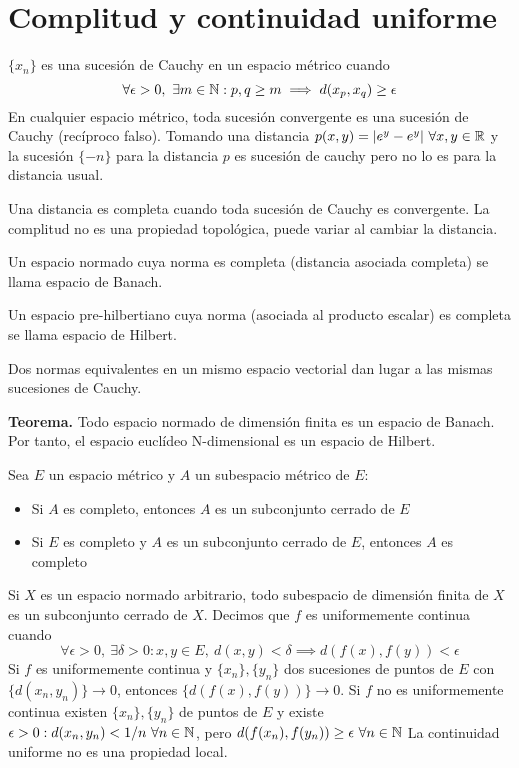 \section{Complitud y continuidad uniforme}
$\{x_n\}$ es una sucesión de Cauchy en un espacio métrico cuando
$$ \forall\epsilon>0, \ \exists m\in\mathbb{N} : p,q\geq m\implies d(x_p,x_q) \geq\epsilon$$
En cualquier espacio métrico, toda sucesión convergente es una sucesión de Cauchy (recíproco falso). Tomando una distancia $p(x,y) = |e^y-e^y| \ \forall x,y\in\R$ y la sucesión $\{-n\}$ para la distancia $p$ es sucesión de cauchy pero no lo es para la distancia usual.

Una distancia es completa cuando toda sucesión de Cauchy es convergente. La complitud no es una propiedad topológica, puede variar al cambiar la distancia.

Un espacio normado cuya norma es completa (distancia asociada completa) se llama espacio de Banach.

Un espacio pre-hilbertiano cuya norma (asociada al producto escalar) es completa se llama espacio de Hilbert.

Dos normas equivalentes en un mismo espacio vectorial dan lugar a las mismas sucesiones de Cauchy.

\textbf{Teorema.} Todo espacio normado de dimensión finita es un espacio de Banach. Por tanto, el espacio euclídeo N-dimensional es un espacio de Hilbert.

Sea $E$ un espacio métrico y $A$ un subespacio métrico de $E$:
\begin{itemize}
	\item Si $A$ es completo, entonces $A$ es un subconjunto cerrado de $E$
	\item Si $E$ es completo y $A$ es un subconjunto cerrado de $E$, entonces $A$ es completo
\end{itemize}
Si $X$ es un espacio normado arbitrario, todo subespacio de dimensión finita de $X$ es un subconjunto cerrado de $X$.
Decimos que $f$ es uniformemente continua cuando
$$ \forall\epsilon>0,\ \exists\delta>0 : x,y\in E, \ d(x,y)<\delta\implies d(f(x),f(y))<\epsilon $$
Si $f$ es uniformemente continua y $\{x_n\},\{y_n\}$ dos sucesiones de puntos de $E$ con $\{d(x_n,y_n)\} \rightarrow 0$, entonces $\{d(f(x), f(y))\} \rightarrow 0$. Si $f$ no es uniformemente continua existen $\{x_n\},\{y_n\}$ de puntos de $E$ y existe $\epsilon>0 : d(x_n,y_n)<1/n\ \forall n\in\N$, pero $d(f(x_n), f(y_n))\geq\epsilon\ \forall n\in\mathbb{N}$
La continuidad uniforme no es una propiedad local.

